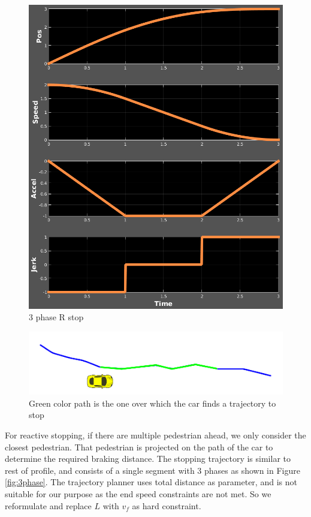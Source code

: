 \documentclass[letterpaper, 10 pt, conference]{ieeeconf}  %
\begin{document}
\begin{figure}[thpb]
  \centering
  \includegraphics[width=1.0\columnwidth]{graphics/3phase_all_derivatives_SlowingDown.png}
  \caption{3 phase R stop}
  \label{fig:3phaserstop}
\end{figure}


\begin{figure}[thpb]
  \centering
  \includegraphics[width=1.0\columnwidth]{graphics/RSTOP_path_truncation.png}
  \caption{Green color path is the one over which the car finds a trajectory to stop}
  \label{fig:pathtostop}
\end{figure}


For reactive stopping, if there are multiple pedestrian ahead, we only consider the
closest pedestrian. That pedestrian is projected on the path of the car to determine the
required braking distance. The stopping trajectory is similar to rest of profile,
and consists of a single segment with 3 phases as shown in Figure \ref{fig:3phase}. 
The trajectory planner uses total distance as parameter, and is not suitable for
our purpose as the end speed constraints are not met. So we reformulate and 
replace $L$ with $v_f$ as hard constraint.
\end{document}
